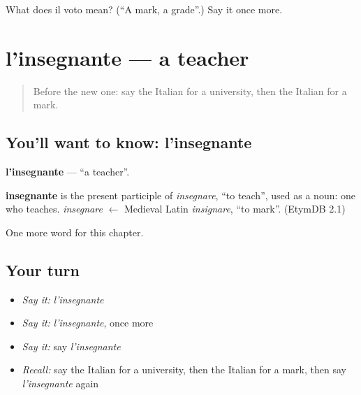 \begin{tcolorbox}[breakable,colback=teal!4,colframe=teal!35!black,title={Before you move on}]
What does il voto mean? (\textquotedblleft{}A mark, a grade\textquotedblright{}.) Say it once more.
\end{tcolorbox}
\section[l'insegnante]{l'insegnante — a teacher}

\label{lesson:IT-C259-insegnante}



\begin{quote}
Before the new one: say the Italian for a university, then the Italian for a mark.
\end{quote}

\subsection*{You'll want to know: l'insegnante}
\textbf{l'insegnante} — \textquotedblleft{}a teacher\textquotedblright{}.

\begin{cousinweb}
\textbf{insegnante} is the present participle of \emph{insegnare}, \textquotedblleft{}to teach\textquotedblright{}, used as a noun: one who teaches. \emph{insegnare} $\leftarrow$ Medieval Latin \emph{insignare}, \textquotedblleft{}to mark\textquotedblright{}. (EtymDB 2.1)
\end{cousinweb}

\begin{grammarlens}[title={What you've built}]
One more word for this chapter.
\end{grammarlens}

\subsection*{Your turn}
\begin{itemize}
\raggedright
  \item \emph{Say it:} \emph{l'insegnante}
  \item \emph{Say it:} \emph{l'insegnante}, once more
  \item \emph{Say it:} say \emph{l'insegnante}
  \item \emph{Recall:} say the Italian for a university, then the Italian for a mark, then say \emph{l'insegnante} again
\end{itemize}

